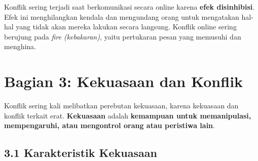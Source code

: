 \documentclass[
  letterpaper,
  DIV=11,
  numbers=noendperiod]{scrreprt}
\begin{document}
Konflik sering terjadi saat berkomunikasi secara online karena
\textbf{efek disinhibisi}. Efek ini menghilangkan kendala dan mengundang
orang untuk mengatakan hal-hal yang tidak akan mereka lakukan secara
langsung. Konflik online sering berujung pada \emph{fire (kebakaran)},
yaitu pertukaran pesan yang memusuhi dan menghina.

\section{Bagian 3: Kekuasaan dan
Konflik}\label{bagian-3-kekuasaan-dan-konflik}

Konflik sering kali melibatkan perebutan kekuasaan, karena kekuasaan dan
konflik terkait erat. \textbf{Kekuasaan} adalah \textbf{kemampuan untuk
memanipulasi, mempengaruhi, atau mengontrol orang atau peristiwa lain}.

\subsection{3.1 Karakteristik Kekuasaan}\label{karakteristik-kekuasaan}
\end{document}
